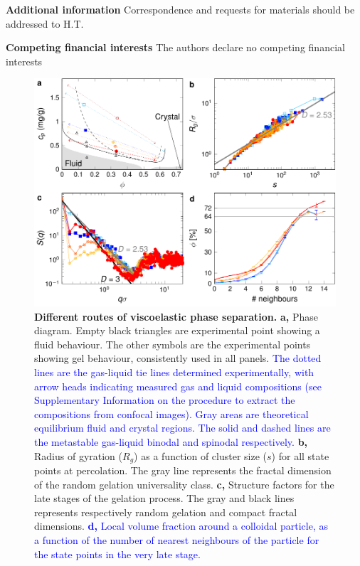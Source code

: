 \documentclass[preprint,amsmath,amssymb,superscriptaddress]{revtex4-1}
\begin{document}
\vspace{0.3cm}
\noindent
{\bf Additional information} 
Correspondence and requests for materials should be addressed to H.T. 

\vspace{0.3cm}
\noindent
{\bf Competing financial interests}
The authors declare no competing financial interests


\clearpage

\begin{figure}[!t]
 \centering
 \includegraphics{phase_separation.pdf}
 \caption{{\bf Different routes of viscoelastic phase separation.} 
{\bf a,} Phase diagram. Empty black triangles are experimental point showing a fluid behaviour. The other symbols are the experimental points showing gel behaviour, consistently used in all panels. \textcolor{blue}{The dotted lines are the gas-liquid tie lines determined experimentally, with arrow heads indicating measured gas and liquid compositions (see Supplementary Information on the procedure to extract the compositions from confocal images).  Gray areas are theoretical equilibrium fluid and crystal regions. The solid and dashed lines are the metastable gas-liquid binodal and spinodal respectively.}
{\bf b,} Radius of gyration ($R_g$) as a function of cluster size ($s$) for all state points at percolation. The
 gray line represents the fractal dimension of the random gelation universality class.
{\bf c,} Structure factors for the late stages of the gelation process. The gray and black lines represents respectively random gelation and compact fractal dimensions.
\textcolor{blue}{{\bf d,} Local volume fraction around a colloidal particle, as a function of the number of nearest neighbours of the particle for the state points in the very late stage.}
 }
 \label{fig:phase_separation}
\end{figure}
\end{document}
